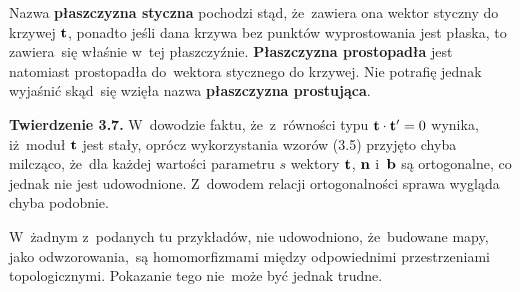 \documentclass[a4paper,11pt]{article}
\begin{document}
\vspace{\spaceTwo}













\newpage


\vspace{0em}



\vspace{0em}


 Nazwa \textbf{płaszczyzna styczna} pochodzi stąd,
że~zawiera ona wektor styczny do krzywej $\mathbf{t}$, ponadto jeśli dana
krzywa bez punktów wyprostowania jest płaska, to zawiera~się właśnie
w~tej płaszczyźnie. \textbf{Płaszczyzna prostopadła} jest natomiast
prostopadła do~wektora stycznego do krzywej. Nie potrafię jednak
wyjaśnić skąd~się wzięła nazwa \textbf{płaszczyzna prostująca}.

\vspace{\spaceFour}





 \textbf{Twierdzenie 3.7.} W~dowodzie faktu, że~z~równości
typu $\mathbf{t} \cdot \mathbf{t}' = 0$ wynika, iż~moduł $\mathbf{t}$ jest stały,
oprócz wykorzystania wzorów (3.5) przyjęto chyba milcząco, że~dla każdej
wartości parametru $s$ wektory $\mathbf{t}$, $\mathbf{n}$ i~$\mathbf{b}$ są
ortogonalne, co jednak nie jest udowodnione. Z~dowodem relacji
ortogonalności sprawa wygląda chyba podobnie. \Dok

\vspace{\spaceFour}





 W~żadnym z~podanych tu przykładów, nie udowodniono,
że~budowane mapy, jako odwzorowania,~są homomorfizmami między
odpowiednimi przestrzeniami topologicznymi. Pokazanie tego nie~może
być jednak trudne. \Dok

\vspace{\spaceFour}
\end{document}
